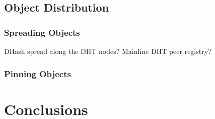 \documentclass{sig-alternate}
\begin{document}
\subsection{Object Distribution}

\subsubsection{Spreading Objects}

DHash spread along the DHT nodes?
Mainline DHT peer registry?

\subsubsection{Pinning Objects}


\section{Conclusions}






%
%
\end{document}
